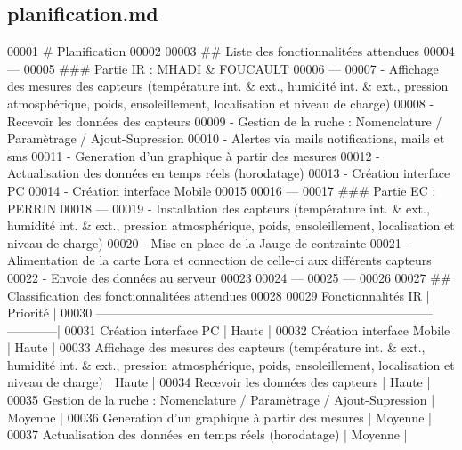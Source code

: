 \hypertarget{planification_8md_source}{}\subsection{planification.\+md}

\begin{DoxyCode}
00001 # Planification
00002 
00003 ## Liste des fonctionnalitées attendues
00004 ---
00005 ### Partie IR : MHADI & FOUCAULT
00006 ---
00007 -     Affichage des mesures des capteurs (température int. & ext., humidité int. & ext., pression
       atmosphérique, poids, ensoleillement, localisation et niveau de charge)
00008 -     Recevoir les données des capteurs
00009 -     Gestion de la ruche : Nomenclature / Paramètrage / Ajout-Supression
00010 -     Alertes via mails notifications, mails et sms
00011 -     Generation d'un graphique à partir des mesures
00012 -     Actualisation des données en temps réels (horodatage)
00013 -     Création interface PC
00014 -     Création interface Mobile
00015 
00016 ---
00017 ### Partie EC : PERRIN
00018 ---
00019 -     Installation des capteurs (température int. & ext., humidité int. & ext., pression
       atmosphérique, poids, ensoleillement, localisation et niveau de charge)
00020 -     Mise en place de la Jauge de contrainte
00021 -     Alimentation de la carte Lora et connection de celle-ci aux différents capteurs
00022 -     Envoie des données au serveur
00023 
00024 ---
00025 ---
00026 
00027 ## Classification des fonctionnalitées attendues
00028 
00029 Fonctionnalités IR                                                               |  Priorité  |
00030 ---------------------------------------------------------------------------------|------------|
00031 Création interface PC                                                            |  Haute     |
00032 Création interface Mobile                                                        |  Haute     |
00033 Affichage des mesures des capteurs (température int. & ext., humidité int. & ext., pression
       atmosphérique, poids, ensoleillement, localisation et niveau de charge)                                               
                                 |  Haute     |
00034 Recevoir les données des capteurs                                                |  Haute     |
00035 Gestion de la ruche : Nomenclature / Paramètrage / Ajout-Supression              |  Moyenne   |
00036 Generation d'un graphique à partir des mesures                                   |  Moyenne   |
00037 Actualisation des données en temps réels (horodatage)                            |  Moyenne    |

\end{DoxyCode}
